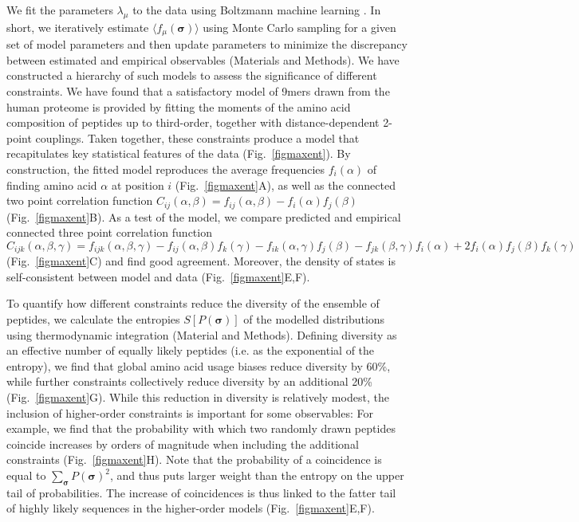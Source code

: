 \documentclass[superscriptaddress,twocolumn,pre]{revtex4}
\newcommand{\B}{\boldsymbol}
\newcommand{\<}{\langle}
\renewcommand{\>}{\rangle}
\begin{document}
We fit the parameters $\lambda_\mu$ to the data using Boltzmann machine learning \cite{Ackley1985}. In short, we iteratively estimate $\langle f_\mu(\B \sigma)\rangle$ using Monte Carlo sampling for a given set of model parameters and then update parameters to minimize the discrepancy between estimated and empirical observables (Materials and Methods).
We have constructed a hierarchy of such models to assess the significance of different constraints. We have found that a satisfactory model of 9mers drawn from the human proteome is provided by fitting the moments of the amino acid composition of peptides up to third-order, together with distance-dependent 2-point couplings. Taken together, these constraints produce a model that recapitulates key statistical features of the data (Fig.~\ref{figmaxent}). By construction, the fitted model reproduces the average frequencies $f_i(\alpha)$ of finding amino acid $\alpha$ at position $i$ (Fig.~\ref{figmaxent}A), as well as the connected two point correlation function $C_{ij}(\alpha, \beta) = f_{ij}(\alpha, \beta) - f_i(\alpha) f_j(\beta)$ (Fig.~\ref{figmaxent}B). As a test of the model, we compare predicted and empirical connected three point correlation function $C_{ijk}(\alpha, \beta, \gamma) = f_{ijk}(\alpha, \beta, \gamma) - f_{ij}(\alpha, \beta) f_k(\gamma) - f_{ik}(\alpha, \gamma) f_j(\beta) - f_{jk}(\beta, \gamma) f_i(\alpha) + 2 f_i(\alpha) f_j(\beta) f_k(\gamma)$ (Fig.~\ref{figmaxent}C) and find good agreement. Moreover, the density of states is self-consistent between model and data (Fig.~\ref{figmaxent}E,F).

To quantify how different constraints reduce the diversity of the ensemble of peptides, we calculate the entropies $S[P(\B \sigma)]$ of the modelled distributions using thermodynamic integration (Material and Methods). Defining diversity as an effective number of equally likely peptides (i.e. as the exponential of the entropy), we find that global amino acid usage biases reduce diversity by 60\%, while further constraints collectively reduce diversity by an additional 20\% (Fig.~\ref{figmaxent}G). While this reduction in diversity is relatively modest, the inclusion of higher-order constraints is important for some observables: For example, we find that the probability with which two randomly drawn peptides coincide increases by orders of magnitude when including the additional constraints (Fig.~\ref{figmaxent}H). Note that the probability of a coincidence is equal to $\sum_{\B \sigma} P(\B \sigma)^2$, and thus puts larger weight than the entropy on the upper tail of probabilities. The increase of coincidences is thus linked to the fatter tail of highly likely sequences in the higher-order models (Fig.~\ref{figmaxent}E,F).
\end{document}
